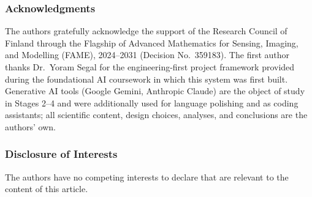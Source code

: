 \documentclass[11pt,a4paper]{article}
\providecommand{\ackname}{Acknowledgments}
\providecommand{\discintname}{Disclosure of Interests}
\begin{document}

\begin{credits}
\subsubsection*{\ackname}
The authors gratefully acknowledge the support of the Research Council
of Finland through the Flagship of Advanced Mathematics for Sensing,
Imaging, and Modelling (FAME), 2024--2031 (Decision No.\ 359183). The
first author thanks Dr.\ Yoram Segal for the engineering-first project
framework provided during the foundational AI coursework in which this
system was first built.
Generative AI tools (Google Gemini, Anthropic Claude) are the object of
study in Stages 2--4 and were additionally used for language polishing
and as coding assistants; all scientific content, design choices,
analyses, and conclusions are the authors' own.

\subsubsection*{\discintname}
The authors have no competing interests to declare that are relevant
to the content of this article.
\end{credits}
\end{document}
